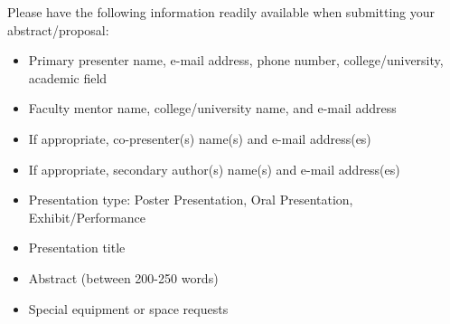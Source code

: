 \documentclass[12pt]{article}
\begin{document}
    Please have the following information readily available when submitting your abstract/proposal:\begin{itemize}
    \item Primary presenter name, e-mail address, phone number, college/university, academic field
    \item Faculty mentor name, college/university name, and e-mail address
    \item If appropriate, co-presenter(s) name(s) and e-mail address(es)
    \item If appropriate, secondary author(s) name(s) and e-mail address(es)
    \item Presentation type: Poster Presentation, Oral Presentation, Exhibit/Performance
    \item Presentation title
    \item Abstract (between 200-250 words)
    \item Special equipment or space requests
    \end{itemize}

\pagebreak
\end{document}
